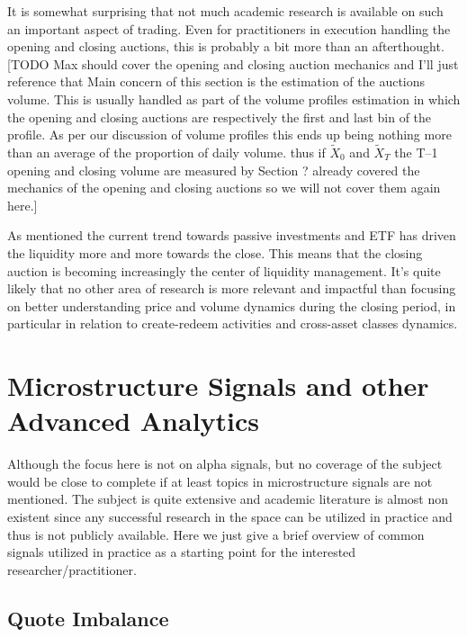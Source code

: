 It is somewhat surprising that not much academic research is available on such an important aspect of trading. Even for practitioners in execution handling the opening and closing auctions, this is probably a bit more than an afterthought. [TODO  Max should cover the opening and closing auction mechanics and I'll just reference that Main concern of this section is the estimation of the auctions volume. This is usually handled as part of the volume profiles estimation in which the opening and closing auctions are respectively the first and last bin of the profile. As per our discussion of volume profiles this ends up being nothing more than an average of the proportion of daily volume. thus if $\tilde{X}_0$ and $\tilde{X}_T$ the T--1 opening and closing volume are measured by Section ? already covered the mechanics of the opening and closing auctions so we will not cover them again here.]



As mentioned the current trend towards passive investments and ETF has driven the liquidity more and more towards the close. This means that the closing auction is becoming increasingly the center of liquidity management.  It's quite likely that no other area of research is more relevant and impactful than focusing on better understanding price and volume dynamics during the closing period, in particular in relation to create-redeem activities and cross-asset classes dynamics.


\section{Microstructure Signals and other Advanced Analytics}

Although the focus here is not on alpha signals, but no coverage of the subject would be close to complete if at least topics in microstructure signals are not mentioned. The subject is quite extensive and academic literature is almost non existent since any successful research in the space can be utilized in practice and thus is not publicly available. Here we just give a brief overview of common signals utilized in practice as a starting point for the interested researcher/practitioner.


\subsection{Quote Imbalance}

